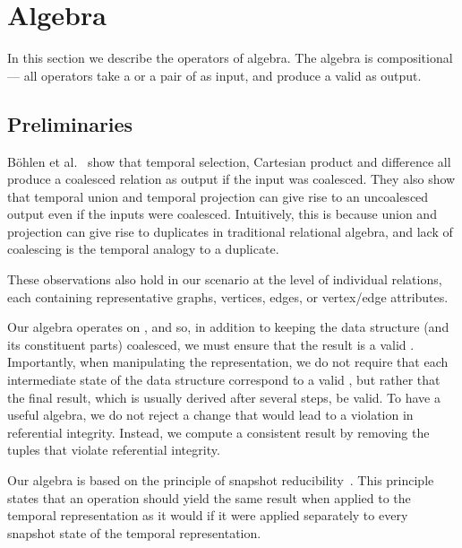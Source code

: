 \section{Algebra}
\label{sec:algebra}

In this section we describe the operators of \tg algebra.  The algebra
is compositional --- all operators take a \tg or a pair of \tgs as
input, and produce a valid \tg as output.

\subsection{Preliminaries}
\label{sec:algebra:prelim}

B\"ohlen et al.~\cite{DBLP:conf/vldb/BohlenSS96} show that temporal
selection, Cartesian product and difference all produce a coalesced
relation as output if the input was coalesced.  They also show that
temporal union and temporal projection can give rise to an uncoalesced
output even if the inputs were coalesced.  Intuitively, this is
because union and projection can give rise to duplicates in
traditional relational algebra, and lack of coalescing is the temporal
analogy to a duplicate.

These observations also hold in our scenario at the level of
individual relations, each containing representative graphs, vertices,
edges, or vertex/edge attributes.

Our algebra operates on \tgs, and so, in addition to keeping the data
structure (and its constituent parts) coalesced, we must ensure that
the result is a valid \tg.  Importantly, when manipulating the \ve
representation, we do not require that each intermediate state of the
data structure correspond to a valid \tg, but rather that the final
result, which is usually derived after several steps, be valid.  To
have a useful algebra, we do not reject a change that would lead to a
violation in referential integrity.  Instead, we compute a consistent
result by removing the tuples that violate referential integrity.

Our algebra is based on the principle of snapshot
reducibility~\cite{DBLP:reference/db/Bohlen092}.  This principle
states that an operation should yield the same result when applied to
the temporal representation as it would if it were applied separately
to every snapshot state of the temporal representation.

